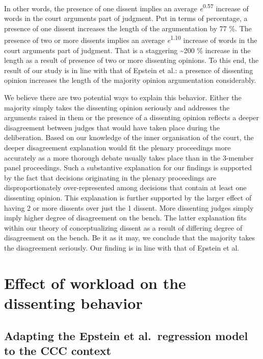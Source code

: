 \documentclass[
  11pt,
]{article}
\begin{document}
In other words, the presence of one dissent implies an average
\emph{e}\textsuperscript{0.57} increase of words in the court arguments
part of judgment. Put in terms of percentage, a presence of one dissent
increases the length of the argumentation by 77 \%. The presence of two
or more dissents implies an average \emph{e}\textsuperscript{1.10}
increase of words in the court arguments part of judgment. That is a
staggering \textasciitilde200 \% increase in the length as a result of
presence of two or more dissenting opinions. To this end, the result of
our study is in line with that of Epstein et al.: a presence of
dissenting opinion increases the length of the majority opinion
argumentation considerably.

We believe there are two potential ways to explain this behavior. Either
the majority simply takes the dissenting opinion seriously and addresses
the arguments raised in them or the presence of a dissenting opinion
reflects a deeper disagreement between judges that would have taken
place during the deliberation. Based on our knowledge of the inner
organisation of the court, the deeper disagreement explanation would fit
the plenary proceedings more accurately as a more thorough debate
usually takes place than in the 3-member panel proceedings. Such a
substantive explanation for our findings is supported by the fact that
decisions originating in the plenary proceedings are disproportionately
over-represented among decisions that contain at least one dissenting
opinion. This explanation is further supported by the larger effect of
having 2 or more dissents over just the 1 dissent. More dissenting
judges simply imply higher degree of disagreement on the bench. The
latter explanation fits within our theory of conceptualizing dissent as
a result of differing degree of disagreement on the bench. Be it as it
may, we conclude that the majority takes the disagreement seriously. Our
finding is in line with that of Epstein et al.

\hypertarget{effect-of-workload-on-the-dissenting-behavior}{%
\section{Effect of workload on the dissenting
behavior}\label{effect-of-workload-on-the-dissenting-behavior}}

\hypertarget{adapting-the-epstein-et-al.-regression-model-to-the-ccc-context-1}{%
\subsection{Adapting the Epstein et al.~regression model to the CCC
context}\label{adapting-the-epstein-et-al.-regression-model-to-the-ccc-context-1}}
\end{document}
